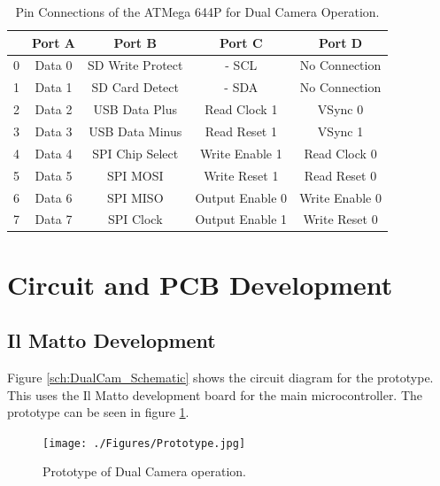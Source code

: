 \begin{table}
\centering
\begin{tabular}{|c|c|c|c|c|}\hline
	& 	Port A 	& 	Port B 			& 	Port C 				& 	Port D 		\\ \hline
0	&	Data 0	&	SD Write Protect&	\itc - SCL			&	No Connection	\\
1	&	Data 1	&	SD Card Detect	&	\itc - SDA			&	No Connection	\\
2	&	Data 2	&	USB Data Plus	&	Read Clock 1		&	VSync 0			\\
3	&	Data 3	&	USB Data Minus	&	Read Reset 1		&	VSync 1			\\
4	&	Data 4	&	SPI Chip Select	&	Write Enable 1		&	Read Clock 0	\\
5	&	Data 5	&	SPI	MOSI 		&	Write Reset 1		&	Read Reset 0	\\
6	&	Data 6	&	SPI MISO		&	Output Enable 0		&	Write Enable 0	\\
7	&	Data 7	&	SPI Clock		&	Output Enable 1		&	Write Reset 0	\\
\hline

\end{tabular}
\caption{Pin Connections of the ATMega 644P for Dual Camera Operation.}
\label{table:644Pin}
\end{table}
\section{Circuit and PCB Development}
\subsection{Il Matto Development}
Figure \ref{sch:DualCam_Schematic} shows the circuit diagram for the prototype. This uses the Il Matto development board for the main microcontroller. The prototype can be seen in figure \ref{fig:Prototype}. 

\begin{figure}
\texttt{[image: ./Figures/Prototype.jpg]}
\caption{Prototype of Dual Camera operation.}
\label{fig:Prototype}
\end{figure}